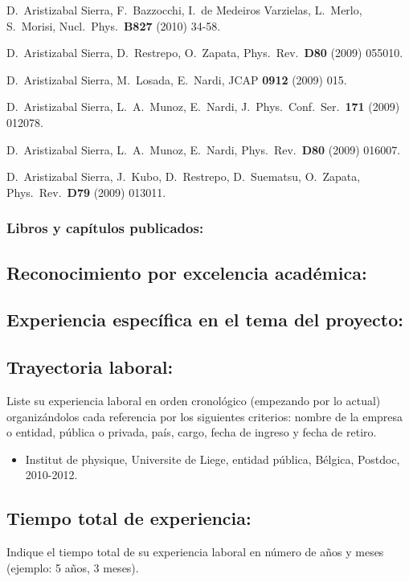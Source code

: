   D.~Aristizabal Sierra, F.~Bazzocchi, I.~de Medeiros Varzielas, L.~Merlo, S.~Morisi,
  Nucl.\ Phys.\  {\bf B827 } (2010)  34-58.

  D.~Aristizabal Sierra, D.~Restrepo, O.~Zapata,
  Phys.\ Rev.\  {\bf D80 } (2009)  055010.

  D.~Aristizabal Sierra, M.~Losada, E.~Nardi,
  JCAP {\bf 0912 } (2009)  015.

  D.~Aristizabal Sierra, L.~A.~Munoz, E.~Nardi,
  J.\ Phys.\ Conf.\ Ser.\  {\bf 171 } (2009)  012078.

  D.~Aristizabal Sierra, L.~A.~Munoz, E.~Nardi,
  Phys.\ Rev.\  {\bf D80 } (2009)  016007.

  D.~Aristizabal Sierra, J.~Kubo, D.~Restrepo, D.~Suematsu, O.~Zapata,
  Phys.\ Rev.\  {\bf D79 } (2009)  013011.
\subsubsection{Libros y capítulos publicados:}
\subsection{Reconocimiento por excelencia académica:}
\subsection{Experiencia específica en el tema del proyecto:}
\subsection{Trayectoria laboral:}
\begin{instrucciones}
  Liste su experiencia laboral en orden cronológico (empezando por lo
  actual) organizándolos cada referencia por los siguientes criterios:
  nombre de la empresa o entidad, pública o privada, país, cargo,
  fecha de ingreso y fecha de retiro.
\end{instrucciones}
\begin{itemize}
\item  Institut de physique, Universite de Liege, entidad pública, Bélgica, Postdoc, 2010-2012. 
\end{itemize}
\subsection{Tiempo total de experiencia:}
\begin{instrucciones}
  Indique el tiempo total de su experiencia laboral en número de años
  y meses (ejemplo: 5 años, 3 meses).
\end{instrucciones}



